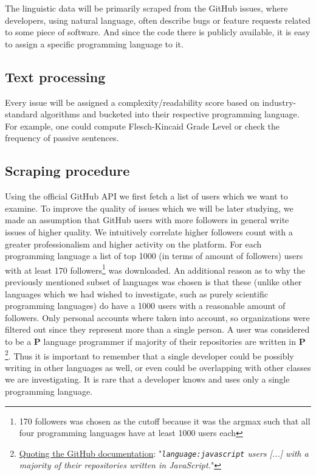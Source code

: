 \documentclass[]{article}
\newcommand{\code}[1]{\texttt{#1}}
\begin{document}
The linguistic data will be primarily scraped from the GitHub issues, where developers, using natural language, often describe bugs or feature requests related to some piece of software. And since the code there is publicly available, it is easy to assign a specific programming language to it.

\subsection{Text processing}

Every issue will be assigned a complexity/readability score based on industry-standard algorithms and bucketed into their respective programming language. For example, one could compute Flesch-Kincaid Grade Level or check the frequency of passive sentences.

\subsection{Scraping procedure} \label{scraping_procedure}

Using the official GitHub API we first fetch a list of users which we want to examine. To improve the quality of issues which we will be later studying, we made an assumption that GitHub users with more followers in general write issues of higher quality. We intuitively correlate higher followers count with a greater professionalism and higher activity on the platform. For each programming language a list of top 1000 (in terms of amount of followers) users with at least 170 followers\footnote{170 followers was chosen as the cutoff because it was the argmax such that all four programming languages have at least 1000 users each} was downloaded. An additional reason as to why the previously mentioned subset of languages was chosen is that these (unlike other languages which we had wished to investigate, such as purely scientific programming languages) do have a 1000 users with a reasonable amount of followers. Only personal accounts where taken into account, so organizations were filtered out since they represent more than a single person. A user was considered to be a $\mathbf P$ language programmer if majority of their repositories are written in $\mathbf P$\footnote{\href{https://docs.github.com/en/search-github/searching-on-github/searching-users\#search-by-repository-language}{Quoting the GitHub documentation}: "{\it \code{language:javascript} users [...] with a majority of their repositories written in JavaScript.}"}. Thus it is important to remember that a single developer could be possibly writing in other languages as well, or even could be overlapping with other classes we are investigating. It is rare that a developer knows and uses only a single programming language.
\end{document}
